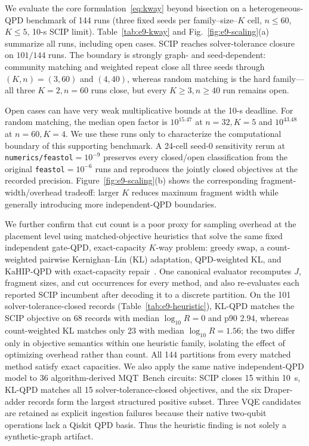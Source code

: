 \documentclass[
  aps,
  pra,
  reprint,
  amsmath,
  amssymb,
  longbibliography,
  nofootinbib,
  floatfix
]{revtex4-2}
\theoremstyle{plain}
\begin{document}
We evaluate the core formulation~\eqref{eq:kway} beyond bisection on a heterogeneous-QPD benchmark of 144 runs (three fixed seeds per family--size--$K$ cell, $n\le60$, $K\le5$, 10-s SCIP limit). Table~\ref{tab:e9-kway} and Fig.~\ref{fig:e9-scaling}(a) summarize all runs, including open cases. SCIP reaches solver-tolerance closure on $101/144$ runs. The boundary is strongly graph- and seed-dependent: community matching and weighted repeat close all three seeds through $(K,n)=(3,60)$ and $(4,40)$, whereas random matching is the hard family---all three $K=2,n=60$ runs close, but every $K\geq3,n\geq40$ run remains open.

Open cases can have very weak multiplicative bounds at the 10-s deadline. For random matching, the median open factor is $10^{15.47}$ at $n=32,K=5$ and $10^{43.48}$ at $n=60,K=4$. We use these runs only to characterize the computational boundary of this supporting benchmark. A 24-cell seed-0 sensitivity rerun at \texttt{numerics/feastol}$=10^{-9}$ preserves every closed/open classification from the original \texttt{feastol}$=10^{-6}$ runs and reproduces the jointly closed objectives at the recorded precision. Figure~\ref{fig:e9-scaling}(b) shows the corresponding fragment-width/overhead tradeoff: larger $K$ reduces maximum fragment width while generally introducing more independent-QPD boundaries.

We further confirm that cut count is a poor proxy for sampling overhead at the placement level using matched-objective heuristics that solve the same fixed independent gate-QPD, exact-capacity $K$-way problem: greedy swap, a count-weighted pairwise Kernighan--Lin (KL) adaptation, QPD-weighted KL, and KaHIP-QPD with exact-capacity repair~\cite{kernighanlin1970,kahip}. One canonical evaluator recomputes $J$, fragment sizes, and cut occurrences for every method, and also re-evaluates each reported SCIP incumbent after decoding it to a discrete partition. On the 101 solver-tolerance-closed records (Table~\ref{tab:e9-heuristic}), KL-QPD matches the SCIP objective on 68 records with median $\log_{10}R=0$ and p90 $2.94$, whereas count-weighted KL matches only 23 with median $\log_{10}R=1.56$; the two differ only in objective semantics within one heuristic family, isolating the effect of optimizing overhead rather than count. All 144 partitions from every matched method satisfy exact capacities. We also apply the same native independent-QPD model to 36 algorithm-derived MQT~Bench circuits: SCIP closes 15 within 10~s, KL-QPD matches all 15 solver-tolerance-closed objectives, and the six Draper-adder records form the largest structured positive subset. Three VQE candidates are retained as explicit ingestion failures because their native two-qubit operations lack a Qiskit QPD basis. Thus the heuristic finding is not solely a synthetic-graph artifact.
\end{document}

